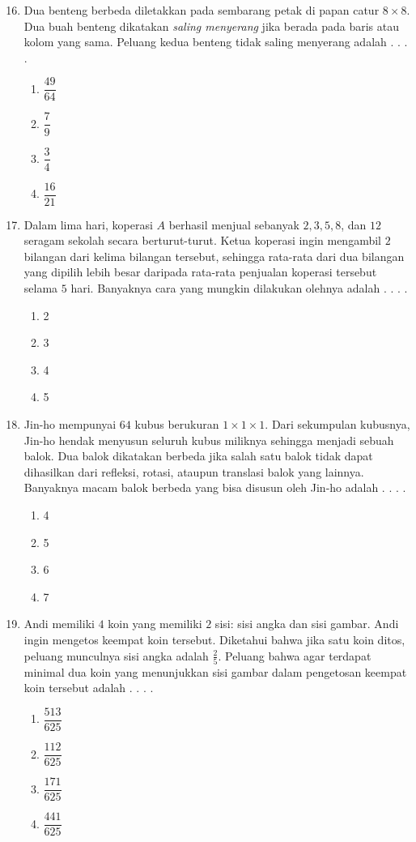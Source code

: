\documentclass[12pt]{scrartcl}
\begin{document}
\begin{enumerate}[label={Soal \arabic*}]
    \setcounter{enumi}{15}
    \item Dua benteng berbeda diletakkan pada sembarang petak di papan catur $8\times 8$. Dua buah benteng dikatakan \textit{saling menyerang} jika berada pada baris atau kolom yang sama. Peluang kedua benteng tidak saling menyerang adalah . . . .
    \begin{enumerate}[label={(\Alph*)}]
        \item $\dfrac{49}{64}$ \item $\dfrac{7}{9}$ \item $\dfrac{3}{4}$ \item $\dfrac{16}{21}$
    \end{enumerate}

    \item Dalam lima hari, koperasi $A$ berhasil menjual sebanyak $2,3,5,8$, dan $12$ seragam sekolah secara berturut-turut. Ketua koperasi ingin mengambil $2$ bilangan dari kelima bilangan tersebut, sehingga rata-rata dari dua bilangan yang dipilih lebih besar daripada rata-rata penjualan koperasi tersebut selama $5$ hari. Banyaknya cara yang mungkin dilakukan olehnya adalah . . . .
    \begin{enumerate}[label={(\Alph*)}]
        \item 2 \item 3 \item 4 \item 5
    \end{enumerate}

    \item Jin-ho mempunyai $64$ kubus berukuran $1\times 1\times 1$. Dari sekumpulan kubusnya, Jin-ho hendak menyusun seluruh kubus miliknya sehingga menjadi sebuah balok. Dua balok dikatakan berbeda jika salah satu balok tidak dapat dihasilkan dari refleksi, rotasi, ataupun translasi balok yang lainnya. Banyaknya macam balok berbeda yang bisa disusun oleh Jin-ho adalah . . . .
    \begin{enumerate}[label={(\Alph*)}]
        \item 4 \item 5 \item 6 \item 7
    \end{enumerate}

    \item Andi memiliki $4$ koin yang memiliki $2$ sisi: sisi angka dan sisi gambar. Andi ingin mengetos keempat koin tersebut. Diketahui bahwa jika satu koin ditos, peluang munculnya sisi angka adalah $\frac{2}{5}$. Peluang bahwa agar terdapat minimal dua koin yang menunjukkan sisi gambar dalam pengetosan keempat koin tersebut adalah . . . .
    \begin{enumerate}[label={(\Alph*)}]
        \item $\dfrac{513}{625}$ \item $\dfrac{112}{625}$ \item $\dfrac{171}{625}$ \item $\dfrac{441}{625}$
    \end{enumerate}


\end{enumerate}
\end{document}
